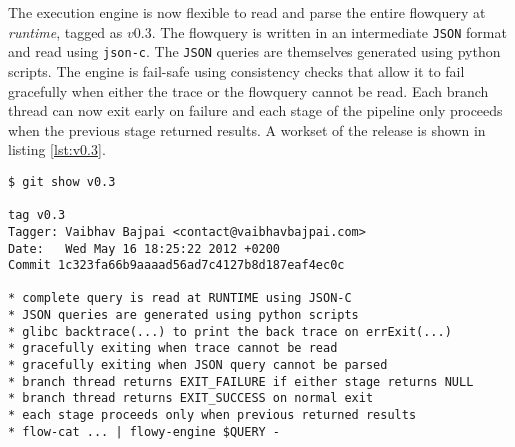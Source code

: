 The execution engine is now flexible to read and parse the entire flowquery at
\emph{runtime}, tagged as $v0.3$. The flowquery is written in an intermediate
\texttt{JSON} format and read using \texttt{json-c}. The \texttt{JSON} queries
are themselves generated using python scripts. The engine is fail-safe using
 consistency checks that allow it to fail gracefully
when either the trace or the flowquery cannot be read. Each branch thread can
now exit early on failure and each stage of the pipeline only proceeds when
the previous stage returned results. A workset of the release is shown in
listing \ref{lst:v0.3}.


\begin{lstlisting}
$ git show v0.3

tag v0.3
Tagger: Vaibhav Bajpai <contact@vaibhavbajpai.com>
Date:   Wed May 16 18:25:22 2012 +0200
Commit 1c323fa66b9aaaad56ad7c4127b8d187eaf4ec0c

* complete query is read at RUNTIME using JSON-C
* JSON queries are generated using python scripts
* glibc backtrace(...) to print the back trace on errExit(...)
* gracefully exiting when trace cannot be read
* gracefully exiting when JSON query cannot be parsed
* branch thread returns EXIT_FAILURE if either stage returns NULL
* branch thread returns EXIT_SUCCESS on normal exit
* each stage proceeds only when previous returned results
* flow-cat ... | flowy-engine $QUERY -
\end{lstlisting}

